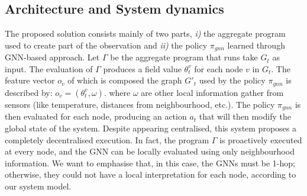 \documentclass[conference]{IEEEtran}
\begin{document}
\subsection{Architecture and System dynamics}
The proposed solution consists mainly of two parts, 
\emph{i)} the aggregate program used to create part of the observation and 
\emph{ii)} the policy $\pi_{gnn}$ learned through \ac{GNN}-based approach. 
%
Let $\Gamma$ be the aggregate program that runs take $G_t$ as input.  
%
The evaluation of $\Gamma$ produces a field value $\theta^v_t$ for each node $v$ in $G_t$. 
The feature vector $o_v$ of which is composed the graph $G'_t$ used by the policy $\pi_{gnn}$ is described by:
 $o_v = (\theta^v_t, \omega)$.
 where $\omega$ are other local information gather from sensors (like temperature, distances from neighbourhood, etc.). 
%
The policy $\pi_{gnn}$ is then evaluated for each node, 
 producing an action $a_t$ that will then modify the global state of the system.
%
Despite appearing centralised, this system proposes a completely decentralised execution. 
%
In fact, the program $\Gamma$ is proactively executed at every node, 
and the \ac{GNN} can be locally evaluated using only neighbourhood information. 
%
We want to emphasise that, in this case, the \acp{GNN} must be 1-hop; 
otherwise, they could not have a local interpretation for each node, according to our system model.
\end{document}
